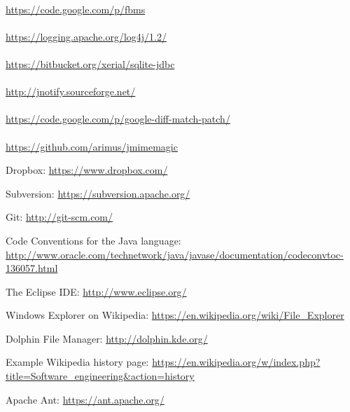 \documentclass[12pt,a4paper]{article}
\begin{document}
 \\
\url{https://code.google.com/p/fbms} \\

 \\
\url{https://logging.apache.org/log4j/1.2/} \\

 \\
\url{https://bitbucket.org/xerial/sqlite-jdbc} \\

 \\
\url{http://jnotify.sourceforge.net/} \\

 \\
\url{https://code.google.com/p/google-diff-match-patch/} \\

 \\
\url{https://github.com/arimus/jmimemagic}

\begin{thebibliography}{9}

  Dropbox: \url{https://www.dropbox.com/}
  
  Subversion: \url{https://subversion.apache.org/}

  Git: \url{http://git-scm.com/}

  Code Conventions for the Java language: \url{http://www.oracle.com/technetwork/java/javase/documentation/codeconvtoc-136057.html}
  
  The Eclipse IDE: \url{http://www.eclipse.org/}

  Windows Explorer on Wikipedia: \url{https://en.wikipedia.org/wiki/File_Explorer}

  Dolphin File Manager: \url{http://dolphin.kde.org/}
  
  Example Wikipedia history page: \url{https://en.wikipedia.org/w/index.php?title=Software_engineering&action=history}
  
  Apache Ant: \url{https://ant.apache.org/}

\end{thebibliography}
\end{document}
